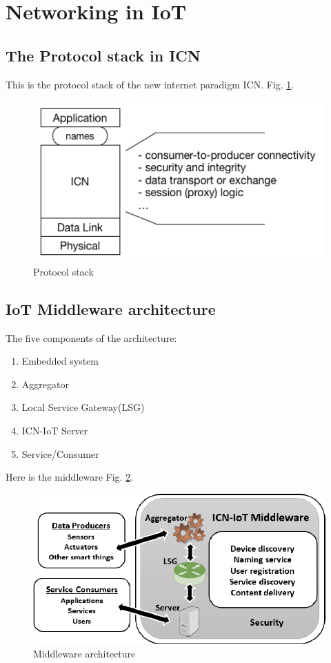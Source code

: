 \section{Networking in IoT}
\label{sec:domain-survey}


\subsection{The Protocol stack in ICN}
 This is the protocol stack of the new internet paradigm ICN. Fig. \ref{fig:stack}.
 \begin{figure}[h]
	\centering
	\includegraphics[width=0.8\linewidth]{Figures/stack.png}
	\caption[]{Protocol stack}
	\label{fig:stack}
\end{figure}

 
\subsection{IoT Middleware architecture}
The five components of the architecture:
\begin{enumerate}
\item Embedded system
\item Aggregator
\item Local Service Gateway(LSG)
\item ICN-IoT Server
\item Service/Consumer
\end{enumerate}
Here is the middleware Fig. \ref{fig:architecture}.
\begin{figure}[h]
	\centering
	\includegraphics[width=0.8\linewidth]{Figures/Architecture.png}
	\caption[]{Middleware architecture}
	\label{fig:architecture}
\end{figure}







